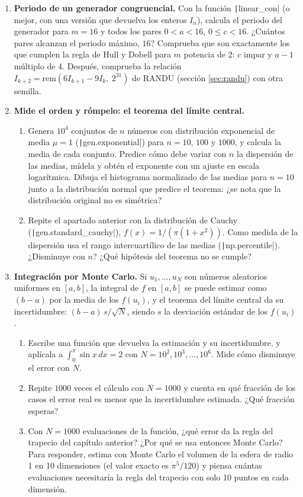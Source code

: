 \begin{enumerate}
\item \label{ej:lcg} \textbf{Periodo de un generador congruencial.} Con la función \texttt|linear_con| (o mejor, con una versión que devuelva los enteros $I_n$), calcula el periodo del generador para $m=16$ y todos los pares $0<a<16$, $0\leq c<16$. ¿Cuántos pares alcanzan el periodo máximo, $16$? Comprueba que son exactamente los que cumplen la regla de Hull y Dobell para $m$ potencia de 2: $c$ impar y $a-1$ múltiplo de 4. Después, comprueba la relación $I_{k+2}=\text{rem}(6I_{k+1}-9I_k,\ 2^{31})$ de RANDU (sección \ref{sec:randu}) con otra semilla.

\item \label{ej:tlc_orden} \textbf{Mide el orden y rómpelo: el teorema del límite central.}
\begin{enumerate}
\item Genera $10^4$ conjuntos de $n$ números con distribución exponencial de media $\mu=1$ (\texttt|gen.exponential|) para $n=10$, $100$ y $1000$, y calcula la media de cada conjunto. Predice cómo debe variar con $n$ la dispersión de las medias, mídela y obtén el exponente con un ajuste en escala logarítmica. Dibuja el histograma normalizado de las medias para $n=10$ junto a la distribución normal que predice el teorema: ¿se nota que la distribución original no es simétrica?
\item Repite el apartado anterior con la distribución de Cauchy (\texttt|gen.standard_cauchy|), $f(x)=1/\left(\pi(1+x^2)\right)$. Como medida de la dispersión usa el rango intercuartílico de las medias (\texttt|np.percentile|). ¿Disminuye con $n$? ¿Qué hipótesis del teorema no se cumple?
\end{enumerate}

\item \label{ej:montecarlo} \textbf{Integración por Monte Carlo.} Si $u_1,\dots,u_N$ son números aleatorios uniformes en $[a,b]$, la integral de $f$ en $[a,b]$ se puede estimar como $(b-a)$ por la media de los $f(u_i)$, y el teorema del límite central da su incertidumbre: $(b-a)\,s/\sqrt{N}$, siendo $s$ la desviación estándar de los $f(u_i)$.
\begin{enumerate}
\item Escribe una función que devuelva la estimación y su incertidumbre, y aplícala a $\int_0^{\pi}\sin x\,dx=2$ con $N=10^2,10^3,\dots,10^6$. Mide cómo disminuye el error con $N$.
\item Repite $1000$ veces el cálculo con $N=1000$ y cuenta en qué fracción de los casos el error real es menor que la incertidumbre estimada. ¿Qué fracción esperas?
\item Con $N=1000$ evaluaciones de la función, ¿qué error da la regla del trapecio del capítulo anterior? ¿Por qué se usa entonces Monte Carlo? Para responder, estima con Monte Carlo el volumen de la esfera de radio 1 en 10 dimensiones (el valor exacto es $\pi^5/120$) y piensa cuántas evaluaciones necesitaría la regla del trapecio con solo 10 puntos en cada dimensión.
\end{enumerate}


\end{enumerate}
